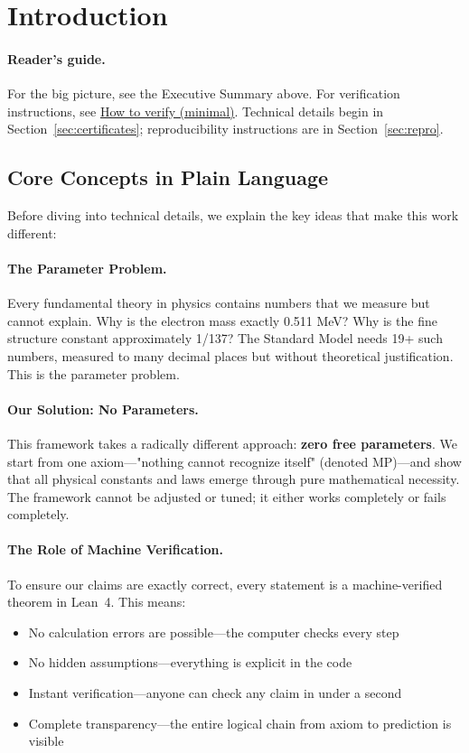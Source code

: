 \documentclass[11pt,a4paper,twoside]{article}
\numberwithin{equation}{section}
\theoremstyle{customthm}
\theoremstyle{customdef}
\theoremstyle{customrem}
\begin{document}
\newpage
\tableofcontents
\newpage

\section{Introduction}
\paragraph{Reader's guide.} For the big picture, see the Executive Summary above. For verification instructions, see \hyperlink{verify-minimal}{How to verify (minimal)}. Technical details begin in Section~\ref{sec:certificates}; reproducibility instructions are in Section~\ref{sec:repro}.

\subsection{Core Concepts in Plain Language}

Before diving into technical details, we explain the key ideas that make this work different:

\paragraph{The Parameter Problem.} Every fundamental theory in physics contains numbers that we measure but cannot explain. Why is the electron mass exactly 0.511 MeV? Why is the fine structure constant approximately 1/137? The Standard Model needs 19+ such numbers, measured to many decimal places but without theoretical justification. This is the parameter problem.

\paragraph{Our Solution: No Parameters.} This framework takes a radically different approach: \textbf{zero free parameters}. We start from one axiom—"nothing cannot recognize itself" (denoted MP)—and show that all physical constants and laws emerge through pure mathematical necessity. The framework cannot be adjusted or tuned; it either works completely or fails completely.

\paragraph{The Role of Machine Verification.} To ensure our claims are exactly correct, every statement is a machine-verified theorem in Lean~4. This means:
\begin{itemize}[leftmargin=*,topsep=2pt,itemsep=2pt]
\item No calculation errors are possible—the computer checks every step
\item No hidden assumptions—everything is explicit in the code  
\item Instant verification—anyone can check any claim in under a second
\item Complete transparency—the entire logical chain from axiom to prediction is visible
\end{itemize}
\end{document}
